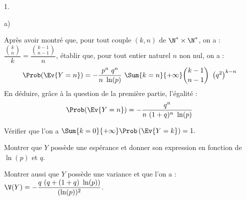 \begin{noliste}{1.}
\begin{noliste}{a)}
    
    
  \item Après avoir montré que, pour tout couple $(k,n)$ de $\N^*
    \times \N^*$, on a : $\dfrac{\binom{k}{n}}{k} =
    \dfrac{\binom{k-1}{n-1}}{n}$, établir que, pour tout entier
    naturel $n$ non nul, on a :
    \[
    \Prob(\Ev{Y = n}) = -\dfrac{p^{n} \ q^{n}}{n \ \ln(p)} \ \Sum{k =
      n}{+ \infty} \dbinom{k-1}{n-1} \ \left(q^{2} \right)^{k-n}
    \]
    En déduire, grâce à la question  de la première partie,
    l'égalité :
    \[
    \Prob(\Ev{Y = n}) = -\dfrac{q^{n}}{n \ (1 + q)^{n} \ \ln(p)}
    \]

    
    
  \item Vérifier que l'on a $\Sum{k = 0}{+ \infty}\Prob\left(\Ev{Y =
        k}\right) = 1.$

    
    



  \item Montrer que $Y$ possède une espérance et donner son expression
    en fonction de $\ln(p)$ et $q$.

    

  \item Montrer aussi que $Y$ possède une variance et que l'on a :
    $\V(Y) = -\dfrac{q \ (q + (1 + q) \ \ln(p))}{(\ln(p))^{2}}$.

    
  \end{noliste}
\end{noliste}

